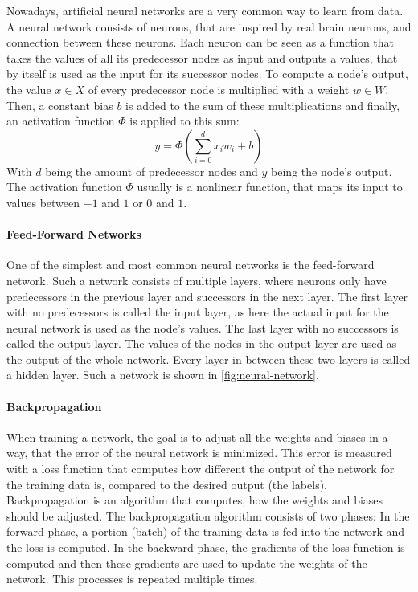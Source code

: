 Nowadays, artificial neural networks are a very common way to learn from data.
A neural network consists of neurons, that are inspired by real brain neurons, and connection between these neurons.
Each neuron can be seen as a function that takes the values of all its predecessor nodes as input and outputs a values, that by itself is used as the input for its successor nodes.
To compute a node's output, the value $x \in X$ of every predecessor node is multiplied with a weight $w \in W$.
Then, a constant bias $b$ is added to the sum of these multiplications and finally, an activation function $\Phi$ is applied to this sum:
\[
	y = \Phi(\sum_{i=0}^{d}x_iw_i + b)
\]
With $d$ being the amount of predecessor nodes and $y$ being the node's output.
The activation function $\Phi$ usually is a nonlinear function, that maps its input to values between $-1$ and $1$ or $0$ and $1$.
\cite[p.~4--13]{Aggarwal2018}

\paragraph{Feed-Forward Networks}

One of the simplest and most common neural networks is the feed-forward network.
Such a network consists of multiple layers, where neurons only have predecessors in the previous layer and successors in the next layer.
The first layer with no predecessors is called the input layer, as here the actual input for the neural network is used as the node's values.
The last layer with no successors is called the output layer.
The values of the nodes in the output layer are used as the output of the whole network.
Every layer in between these two layers is called a hidden layer.
Such a network is shown in \cref{fig:neural-network}.
\cite[p.~17--20]{Aggarwal2018}

\paragraph{Backpropagation}

When training a network, the goal is to adjust all the weights and biases in a way, that the error of the neural network is minimized.
This error is measured with a loss function that computes how different the output of the network for the training data is, compared to the desired output (the labels).
Backpropagation is an algorithm that computes, how the weights and biases should be adjusted.
The backpropagation algorithm consists of two phases: In the forward phase, a portion (batch) of the training data is fed into the network and the loss is computed.
In the backward phase, the gradients of the loss function is computed and then these gradients are used to update the weights of the network.
This processes is repeated multiple times.
\cite[p.~21--24]{Aggarwal2018}

